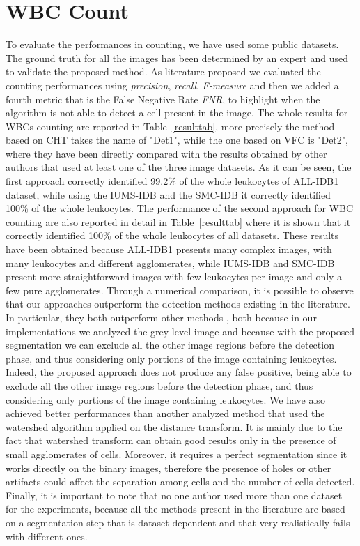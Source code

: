 {	\section{WBC Count} %
	To evaluate the performances in counting, we have used some public datasets.
	The ground truth for all the images has been determined by an expert and used to validate the proposed method. As literature proposed we evaluated the counting performances using \textit{precision}, \textit{recall}, \textit{F-measure} and then we added a fourth metric that is the False Negative Rate \textit{FNR}, to highlight when the algorithm is not able to detect a cell present in the image. The whole results for WBCs counting are reported in Table~\ref{resulttab}, more precisely the method based on CHT takes the name of "Det1", while the one based on VFC is "Det2", where they have been directly compared with the results obtained by other authors that used at least one of the three image datasets. 
	As it can be seen, the first approach correctly identified 99.2\% of the whole leukocytes of ALL-IDB1 dataset, while using the IUMS-IDB and the SMC-IDB it correctly identified 100\% of the whole leukocytes. The performance of the second approach for WBC counting are also reported in detail in Table~\ref{resulttab} where it is shown that it correctly identified 100\% of the whole leukocytes of all datasets. These results have been obtained because ALL-IDB1 presents many complex images, with many leukocytes and different agglomerates, while IUMS-IDB and SMC-IDB present more straightforward images with few leukocytes per image and only a few pure agglomerates. Through a numerical comparison, it is possible to observe that our approaches outperform the detection methods existing in the literature. In particular, they both outperform other methods \cite{Mahmood, Alomari}, both because in our implementations we analyzed the grey level image and because with the proposed segmentation we can exclude all the other image regions before the detection phase, and thus considering only portions of the image containing leukocytes. Indeed, the proposed approach does not produce any false positive, being able to exclude all the other image regions before the detection phase, and thus considering only portions of the image containing leukocytes. We have also achieved better performances than another analyzed method \cite{Put14b} that used the watershed algorithm applied on the distance transform. It is mainly due to the fact that watershed transform can obtain good results only in the presence of small agglomerates of cells.
	Moreover, it requires a perfect segmentation since it works directly on the binary images, therefore the presence of holes or other artifacts could affect the separation among cells and the number of cells detected. Finally, it is important to note that no one author used more than one dataset for the experiments, because all the methods present in the literature are based on a segmentation step that is dataset-dependent and that very realistically fails with different ones.
	
}
